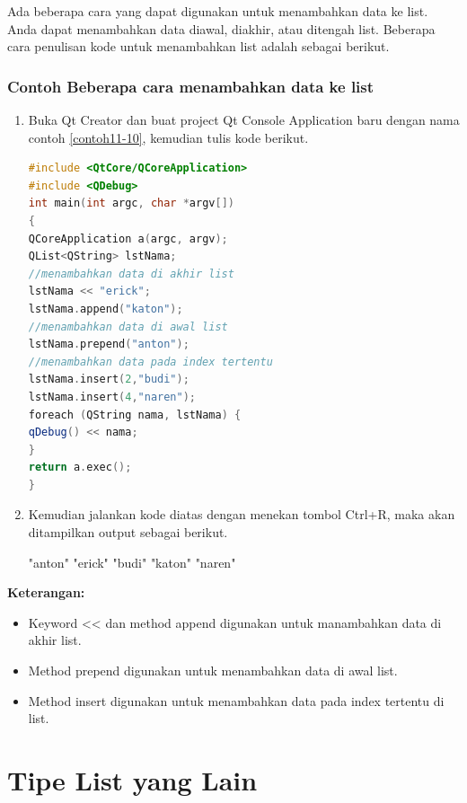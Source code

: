 Ada beberapa cara yang dapat digunakan untuk menambahkan data ke list.
Anda dapat menambahkan data diawal, diakhir, atau ditengah list.
Beberapa cara penulisan kode untuk menambahkan list adalah sebagai
berikut.

\subsubsection*{Contoh Beberapa cara menambahkan data ke list}

\begin{enumerate}

\item
  Buka Qt Creator dan buat project Qt Console Application baru dengan
  nama contoh \ref{contoh11-10}, kemudian tulis kode berikut.

\begin{lstlisting}[language=c++, caption= Beberapa cara menambahkan data ke list, label=contoh11-10]
#include <QtCore/QCoreApplication>
#include <QDebug>
int main(int argc, char *argv[])
{
QCoreApplication a(argc, argv);
QList<QString> lstNama;
//menambahkan data di akhir list
lstNama << "erick";
lstNama.append("katon");
//menambahkan data di awal list
lstNama.prepend("anton");
//menambahkan data pada index tertentu
lstNama.insert(2,"budi");
lstNama.insert(4,"naren");
foreach (QString nama, lstNama) {
qDebug() << nama;
}
return a.exec();
}
\end{lstlisting}
\item
  Kemudian jalankan kode diatas dengan menekan tombol Ctrl+R, maka akan
  ditampilkan output sebagai berikut.

\begin{lcverbatim}
"anton"
"erick"
"budi"
"katon"
"naren"
\end{lcverbatim}
\end{enumerate}

\textbf{Keterangan:}

\begin{itemize}

\item
  Keyword \textless{}\textless{} dan method append digunakan untuk
  manambahkan data di akhir list.
\item
  Method prepend digunakan untuk menambahkan data di awal list.
\item
  Method insert digunakan untuk menambahkan data pada index tertentu di
  list.
\end{itemize}

\section{Tipe List yang Lain}\label{tipe-list-yang-lain}

